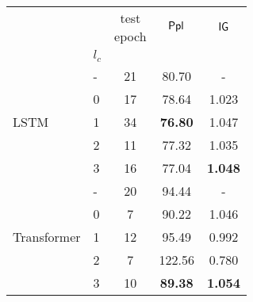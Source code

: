 \begin{tabular}{llccc}
\toprule
                              &       & \makecell{test \\ epoch} & $\mathsf{Ppl}$ & $\mathsf{IG}$ \\
                              & $l_c$ &         &        &           \\
\midrule
\multirow{5}{*}{LSTM}         & - &          21 &  80.70          &       -           \\
                              & 0 &          17 &  78.64          &    1.023          \\
                              & 1 &          34 &  \textbf{76.80} &    1.047          \\
                              & 2 &          11 &  77.32          &    1.035          \\
                              & 3 &          16 &  77.04          &    \textbf{1.048} \\
\midrule
\multirow{5}{*}{Transformer}  & - &          20 &  94.44          &        -          \\
                              & 0 &           7 &  90.22          &    1.046          \\
                              & 1 &          12 &  95.49          &    0.992          \\
                              & 2 &           7 & 122.56          &    0.780          \\
                              & 3 &          10 &  \textbf{89.38} &    \textbf{1.054} \\
\bottomrule
\end{tabular}
